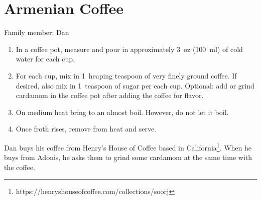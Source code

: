 \chapter{Armenian Coffee}
\label{ch:armeniancoffee}



Family member: Dan

\begin{enumerate}
    \item In a coffee pot, measure and pour in approximately 3~oz (100~ml) of cold water for each cup.
    \item For each cup, mix in 1~heaping teaspoon of very finely ground coffee. If desired, also mix in 1~teaspoon of sugar per each cup. Optional: add or grind cardamom in the coffee pot after adding the coffee for flavor.
    \item On medium heat bring to an almost boil. However, do not let it boil.
    \item Once froth rises, remove from heat and serve.
\end{enumerate}

Dan buys his coffee from Henry's House of Coffee based in California\footnote{https://henryshouseofcoffee.com/collections/soorj}. When he buys from Adonis, he asks them to grind some cardamom at the same time with the coffee.
